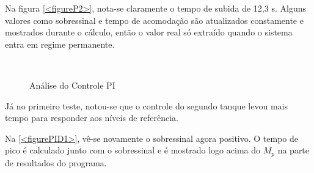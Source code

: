 \documentclass[a4paper,12pt]{article}
\begin{document}
\hspace{4ex}Na figura \ref{<figureP2>}, nota-se claramente o tempo de subida de 12,3 s. Alguns valores como sobressinal e tempo de acomodação são atualizados constamente e mostrados durante o cálculo, então o valor real só extraído quando o sistema entra em regime permanente.
\begin{figure}[H]
     \centering
     \hspace{4ex}
     \\
     
     \caption{Análise do Controle PI}
     \label{fig:ControlePI}
\end{figure}

\hspace{4ex}Já no primeiro teste, notou-se que o controle do segundo tanque levou mais tempo para responder aos níveis de referência.

\hspace{4ex}Na \ref{<figurePID1>}, vê-se novamente o sobressinal agora positivo. O tempo de pico é calculado junto com o sobressinal e é mostrado logo acima do $M_p$ na parte de resultados do programa.
\end{document}
